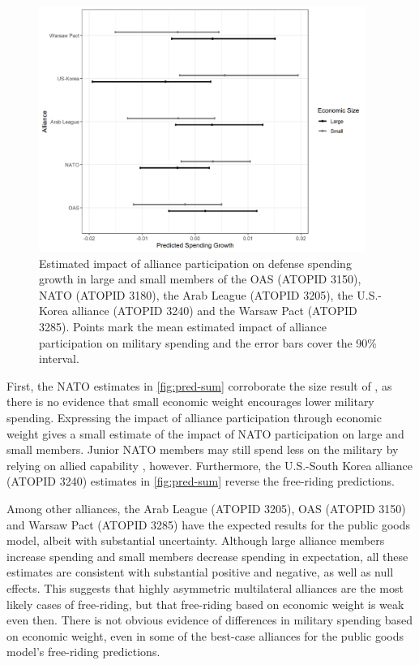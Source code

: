 \documentclass[12pt]{article}
\begin{document}
\begin{figure}[htbp]
	\centering
		\includegraphics[width=0.95\textwidth]{pred-sum.png}
	\caption{Estimated impact of alliance participation on defense spending growth in large and small members of the OAS (ATOPID 3150), NATO (ATOPID 3180), the Arab League (ATOPID 3205), the U.S.-Korea alliance (ATOPID 3240) and the Warsaw Pact (ATOPID 3285). Points mark the mean estimated impact of alliance participation on military spending and the error bars cover the 90\% interval.}
	\label{fig:pred-sum}
\end{figure}


First, the NATO estimates in \autoref{fig:pred-sum} corroborate the size result of \citet{PluemperNeumayer2015}, as there is no evidence that small economic weight encourages lower military spending.
Expressing the impact of alliance participation through economic weight gives a small estimate of the impact of NATO participation on large and small members.  
Junior NATO members may still spend less on the military by relying on allied capability \citep{GeorgeSandler2017}, however. 
Furthermore, the U.S.-South Korea alliance (ATOPID 3240) estimates in \autoref{fig:pred-sum} reverse the free-riding predictions. 


Among other alliances, the Arab League (ATOPID 3205), OAS (ATOPID 3150) and Warsaw Pact (ATOPID 3285) have the expected results for the public goods model, albeit with substantial uncertainty.
Although large alliance members increase spending and small members decrease spending in expectation, all these estimates are consistent with substantial positive and negative, as well as null effects. 
This suggests that highly asymmetric multilateral alliances are the most likely cases of free-riding, but that free-riding based on economic weight is weak even then.
There is not obvious evidence of differences in military spending based on economic weight, even in some of the best-case alliances for the public goods model's free-riding predictions. 
\end{document}
